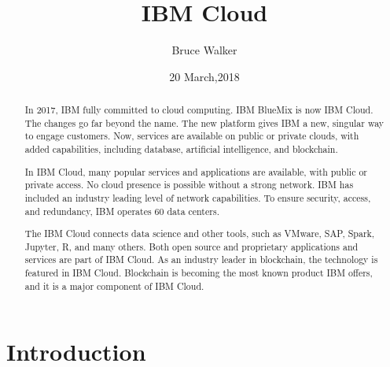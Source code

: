 
\title{IBM Cloud}

\author{Bruce Walker}

\date{20 March,2018}


\maketitle
\begin{abstract}

In 2017, IBM fully committed to cloud computing. IBM BlueMix
is now IBM Cloud. The changes go far beyond the name. The new 
platform gives IBM a new, singular way to engage customers. Now, services are available on public or 
private clouds, with added capabilities, including database, 
artificial intelligence, and blockchain.

In IBM Cloud, many popular services and applications are 
available, with public or private access. No cloud presence 
is possible without a strong network. IBM has included an 
industry leading level of network capabilities. To ensure 
security, access, and redundancy, IBM operates 60 data centers.

The IBM Cloud connects data science and other tools, such as 
VMware, SAP, Spark, Jupyter, R, and many others. Both open source and proprietary 
applications and services are part of IBM Cloud.
As an industry leader in blockchain, the 
technology is featured in IBM Cloud. Blockchain is becoming 
the most known product IBM offers, and it is a major component
of IBM Cloud. 
\end{abstract}




\section{Introduction}

